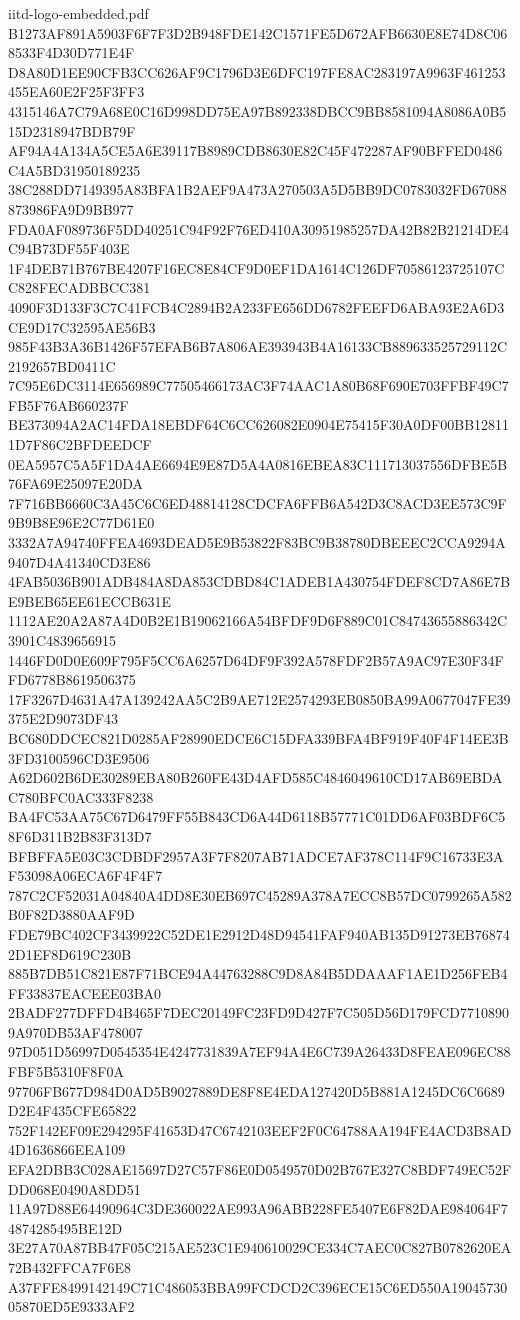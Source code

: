 \begin{filecontents*}[overwrite]{iitd-logo-embedded.pdf}
B1273AF891A5903F6F7F3D2B948FDE142C1571FE5D672AFB6630E8E74D8C068533F4D30D771E4F
D8A80D1EE90CFB3CC626AF9C1796D3E6DFC197FE8AC283197A9963F461253455EA60E2F25F3FF3
4315146A7C79A68E0C16D998DD75EA97B892338DBCC9BB8581094A8086A0B515D2318947BDB79F
AF94A4A134A5CE5A6E39117B8989CDB8630E82C45F472287AF90BFFED0486C4A5BD31950189235
38C288DD7149395A83BFA1B2AEF9A473A270503A5D5BB9DC0783032FD67088873986FA9D9BB977
FDA0AF089736F5DD40251C94F92F76ED410A30951985257DA42B82B21214DE4C94B73DF55F403E
1F4DEB71B767BE4207F16EC8E84CF9D0EF1DA1614C126DF70586123725107CC828FECADBBCC381
4090F3D133F3C7C41FCB4C2894B2A233FE656DD6782FEEFD6ABA93E2A6D3CE9D17C32595AE56B3
985F43B3A36B1426F57EFAB6B7A806AE393943B4A16133CB889633525729112C2192657BD0411C
7C95E6DC3114E656989C77505466173AC3F74AAC1A80B68F690E703FFBF49C7FB5F76AB660237F
BE373094A2AC14FDA18EBDF64C6CC626082E0904E75415F30A0DF00BB128111D7F86C2BFDEEDCF
0EA5957C5A5F1DA4AE6694E9E87D5A4A0816EBEA83C111713037556DFBE5B76FA69E25097E20DA
7F716BB6660C3A45C6C6ED48814128CDCFA6FFB6A542D3C8ACD3EE573C9F9B9B8E96E2C77D61E0
3332A7A94740FFEA4693DEAD5E9B53822F83BC9B38780DBEEEC2CCA9294A9407D4A41340CD3E86
4FAB5036B901ADB484A8DA853CDBD84C1ADEB1A430754FDEF8CD7A86E7BE9BEB65EE61ECCB631E
1112AE20A2A87A4D0B2E1B19062166A54BFDF9D6F889C01C84743655886342C3901C4839656915
1446FD0D0E609F795F5CC6A6257D64DF9F392A578FDF2B57A9AC97E30F34FFD6778B8619506375
17F3267D4631A47A139242AA5C2B9AE712E2574293EB0850BA99A0677047FE39375E2D9073DF43
BC680DDCEC821D0285AF28990EDCE6C15DFA339BFA4BF919F40F4F14EE3B3FD3100596CD3E9506
A62D602B6DE30289EBA80B260FE43D4AFD585C4846049610CD17AB69EBDAC780BFC0AC333F8238
BA4FC53AA75C67D6479FF55B843CD6A44D6118B57771C01DD6AF03BDF6C58F6D311B2B83F313D7
BFBFFA5E03C3CDBDF2957A3F7F8207AB71ADCE7AF378C114F9C16733E3AF53098A06ECA6F4F4F7
787C2CF52031A04840A4DD8E30EB697C45289A378A7ECC8B57DC0799265A582B0F82D3880AAF9D
FDE79BC402CF3439922C52DE1E2912D48D94541FAF940AB135D91273EB768742D1EF8D619C230B
885B7DB51C821E87F71BCE94A44763288C9D8A84B5DDAAAF1AE1D256FEB4FF33837EACEEE03BA0
2BADF277DFFD4B465F7DEC20149FC23FD9D427F7C505D56D179FCD77108909A970DB53AF478007
97D051D56997D0545354E4247731839A7EF94A4E6C739A26433D8FEAE096EC88FBF5B5310F8F0A
97706FB677D984D0AD5B9027889DE8F8E4EDA127420D5B881A1245DC6C6689D2E4F435CFE65822
752F142EF09E294295F41653D47C6742103EEF2F0C64788AA194FE4ACD3B8AD4D1636866EEA109
EFA2DBB3C028AE15697D27C57F86E0D0549570D02B767E327C8BDF749EC52FDD068E0490A8DD51
11A97D88E64490964C3DE360022AE993A96ABB228FE5407E6F82DAE984064F74874285495BE12D
3E27A70A87BB47F05C215AE523C1E940610029CE334C7AEC0C827B0782620EA72B432FFCA7F6E8
A37FFE8499142149C71C486053BBA99FCDCD2C396ECE15C6ED550A1904573005870ED5E9333AF2

\end{filecontents*}
